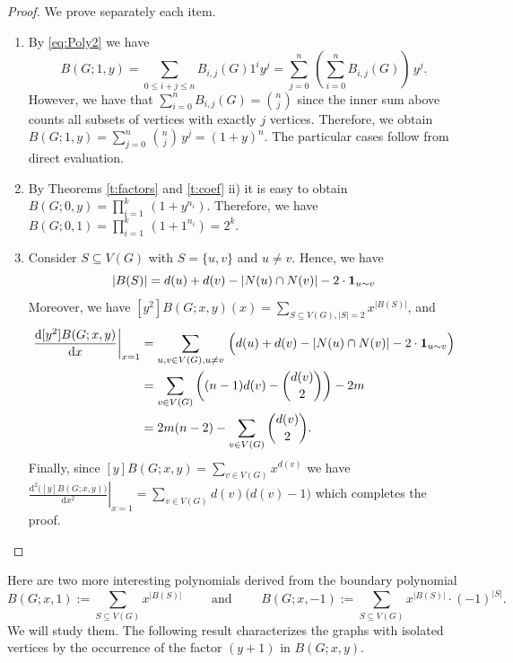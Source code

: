 \documentclass[review]{elsarticle}
\begin{document}
\begin{proof}
We prove separately each item.
\begin{enumerate}[$i)$]
  \item {By \eqref{eq:Poly2} we have 
  $$B(G;1,y) = \sum_{0 \leq i+j \leq n}B_{i,j}(G)1^{i}y^{j}=\sum_{j=0}^{n}\,\left(\sum_{i=0}^{n}B_{i,j}(G)\right)\, y^{j}.$$ 
  However, we have that $\sum_{i=0}^{n}B_{i,j}(G)=\binom{n}{j}$ since the inner sum above counts all subsets of vertices with exactly $j$ vertices. Therefore, we obtain $B(G;1,y) = \displaystyle\sum_{j=0}^{n}\,\binom{n}{j}\, y^{j}=(1+y)^n$. The particular cases follow from direct evaluation.}

  \medskip

  \item {By Theorems \ref{t:factors} and \ref{t:coef} ii) it is easy to obtain $B(G;0,y)=\displaystyle\prod_{i=1}^{k}\,(1+y^{n_i})$. Therefore, we have $B(G;0,1)=\displaystyle\prod_{i=1}^{k}\,(1+1^{n_i})=2^k$.}

  \medskip

  \item {Consider $S\subseteq V(G)$ with $S=\{u,v\}$ and $u\neq v$. Hence, we have 
  $$|B(S)|=d(u)+d(v)-|N(u)\cap N(v)|-2\cdot{\bf 1}_{u\sim v}$$
  Moreover, we have $[y^2]B(G;x,y)(x)=\displaystyle\sum_{S\subseteq V(G), |S|=2} x^{|B(S)|}$, and 
   \begin{align*}
    \displaystyle\left.\frac{\text{d}[y^2]B(G;x,y)}{\text{d}x}\right|_{x=1} & =\sum_{u,v\in V(G), u\neq v}\, \Big(d(u)+d(v)-|N(u)\cap N(v)|-2\cdot{\bf 1}_{u\sim v}\Big) \\
    & = \sum_{v\in V(G)}\left( (n-1)d(v) - \binom{d(v)}{2} \right)  - 2m \\
    & = 2m(n-2)- \sum_{v\in V(G)} \binom{d(v)}{2}.
   \end{align*}
  Finally, since $[y]B(G;x,y)=\displaystyle\sum_{v\in V(G)} x^{d(v)}$ we have $\left.\frac{\text{d}^2\big([y]B(G;x,y)\big)}{\text{d}x^2}\right|_{x=1}=\displaystyle\sum_{v\in V(G)} d(v)\big(d(v)-1\big)$ which completes the proof. 
  
  }
%
%
\end{enumerate}
\end{proof}

Here are two more interesting polynomials derived from the boundary polynomial 
\[
 B(G;x,1):=\displaystyle\sum_{S\subseteq V(G)} x^{|B(S)|}\qquad \text{ and } \qquad B(G;x,-1):=\displaystyle\sum_{S\subseteq V(G)} x^{|B(S)|}\cdot (-1)^{|S|}.
\]
We will study them.
The following result characterizes the graphs with isolated vertices by the occurrence of the factor $(y+1)$ in $B(G;x,y)$.  
\end{document}
